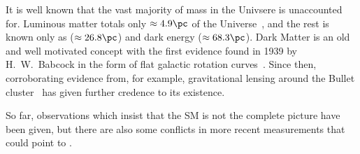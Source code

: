 It is well known that the vast majority of mass in the Univsere is unaccounted for.
Luminous matter totals only $\approx4.9\pc$ of the Universe~\cite{Adam:2015rua,PDG2014}, and the rest
is known only as \dm ($\approx26.8\pc$) and dark energy ($\approx68.3\pc$).
Dark Matter is an old and well motivated concept with the first evidence found in 1939 by H.~W.~Babcock
in the form of flat galactic rotation curves~\cite{1970ApJ...159..379R,1980ApJ...238..471R}.
Since then, corroborating evidence from, for example, gravitational lensing around the Bullet
cluster~\cite{Markevitch:2003at} has given further credence to its existence.





So far, observations which insist that the SM is not the complete picture have been given, but
there are also some conflicts in more recent measurements that could point to \np.

